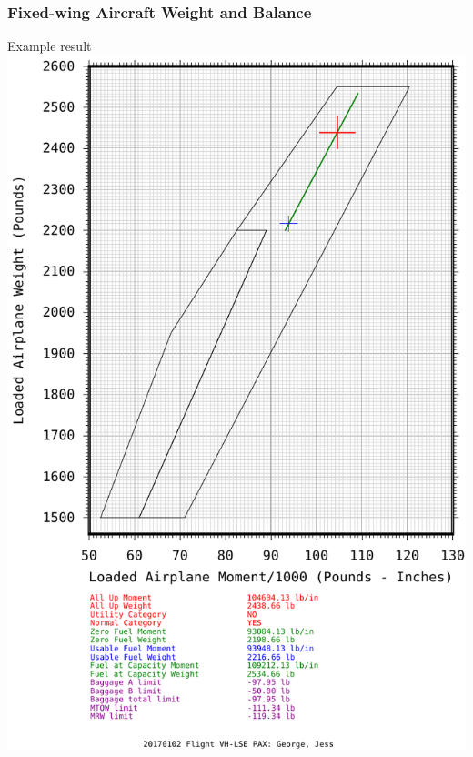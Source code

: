 \begin{frame}
\frametitle{Fixed-wing Aircraft Weight and Balance}
\begin{block}{Example result}
\includegraphics[height=0.6\textheight]{image/20170102-vhlse.png}
\end{block}
\end{frame}
